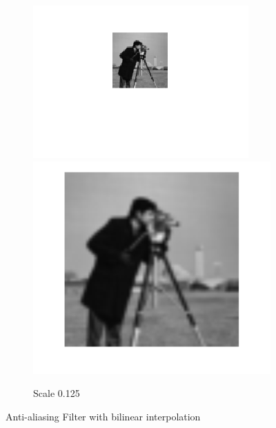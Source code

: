 \documentclass{article}
\begin{document}
\begin{figure}[h!]
\begin{subfigure}[t]{0.3\textwidth}
		\includegraphics[width=\linewidth]{./output_images/DOWN_anti-alias_bilinear_scale_0_125000.png}
		\includegraphics[width=\linewidth]{./output_images/UP_anti-alias_bilinear_scale_0_125000.png}
		\caption{Scale 0.125}
	\end{subfigure}
	\caption{Anti-aliasing Filter with bilinear interpolation}
\end{figure}
	
\end{document}
